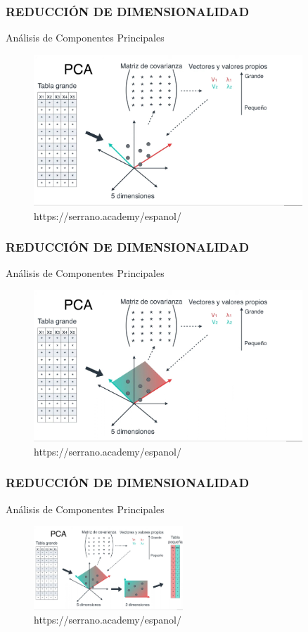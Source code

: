 \documentclass{beamer}
\begin{document}
\begin{frame}
	\frametitle{REDUCCIÓN DE DIMENSIONALIDAD}
	\begin{block}{Análisis de Componentes Principales}	
		\begin{figure}
			\includegraphics[width=0.9\textwidth]{PCA/IMG_3592.jpg}
			\caption{https://serrano.academy/espanol/}
		\end{figure}
	\end{block}
\end{frame}

\begin{frame}
	\frametitle{REDUCCIÓN DE DIMENSIONALIDAD}
	\begin{block}{Análisis de Componentes Principales}	
		\begin{figure}
			\includegraphics[width=0.9\textwidth]{PCA/IMG_3593.jpg}
			\caption{https://serrano.academy/espanol/}
		\end{figure}
	\end{block}
\end{frame}

\begin{frame}
	\frametitle{REDUCCIÓN DE DIMENSIONALIDAD}
	\begin{block}{Análisis de Componentes Principales}	
		\begin{figure}
			\includegraphics[width=0.5\textwidth]{PCA/IMG_3594.jpg}
			\caption{https://serrano.academy/espanol/}
		\end{figure}
	\end{block}
\end{frame}
\end{document}
